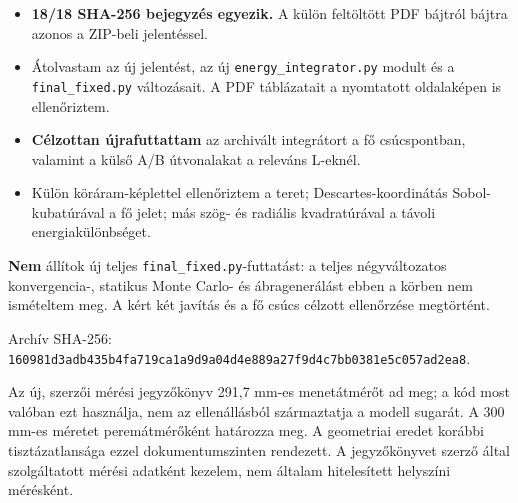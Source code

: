 \documentclass[10pt,a4paper]{article}
\begin{document}
{\begin{itemize}\setlength{\itemsep}{0.5pt}\setlength{\parskip}{0pt}\setlength{\topsep}{1pt}
\item \textbf{18/18 SHA-256 bejegyzés egyezik.} A külön feltöltött PDF bájtról bájtra azonos a ZIP-beli jelentéssel.
\item Átolvastam az új jelentést, az új \texttt{energy\_integrator.py} modult és a \texttt{final\_fixed.py} változásait. A PDF táblázatait a nyomtatott oldalaképen is ellenőriztem.
\item \textbf{Célzottan újrafuttattam} az archivált integrátort a fő csúcspontban, valamint a külső A/B útvonalakat a releváns L-eknél.
\item Külön köráram-képlettel ellenőriztem a teret; Descartes-koordinátás Sobol-kubatúrával a fő jelet; más szög- és radiális kvadratúrával a távoli energiakülönbséget.
\end{itemize}
\par
\textbf{Nem} állítok új teljes \texttt{final\_fixed.py}-futtatást: a teljes négyváltozatos konvergencia-, statikus Monte Carlo- és ábragenerálást ebben a körben nem ismételtem meg. A kért két javítás és a fő csúcs célzott ellenőrzése megtörtént.
\par
Archív SHA-256: \texttt{160981d3adb435b4fa719ca1a9d9a04d4e889a27f9d4c7bb0381e5c057ad2ea8}.
\par
\vspace{2pt}\par\vspace{0.5pt}
\par
Az új, szerzői mérési jegyzőkönyv 291,7 mm-es menetátmérőt ad meg; a kód most valóban ezt használja, nem az ellenállásból származtatja a modell sugarát. A 300 mm-es méretet peremátmérőként határozza meg. A geometriai eredet korábbi tisztázatlansága ezzel dokumentumszinten rendezett. A jegyzőkönyvet szerző által szolgáltatott mérési adatként kezelem, nem általam hitelesített helyszíni mérésként.
\par
\begin{center}
\end{center}}
\end{document}
